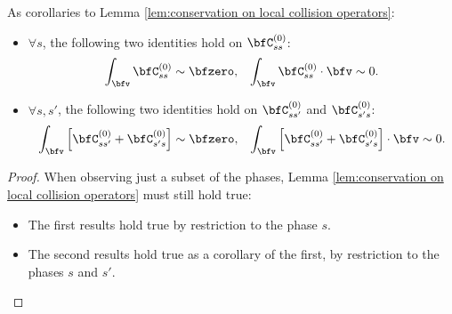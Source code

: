     \begin{corollary}\label{cor:phase-restricted conservation on local collision operators}
        As corollaries to Lemma \ref{lem:conservation on local collision operators}:
        \begin{itemize}
            \item  $\forall s$, the following two identities hold on $\bfC_{ss}^{(0)}$:
            \begin{align}
                \int_{\bfv}\bfC_{ss}^{(0)}           \sim  \bfzero,  &&
                \int_{\bfv}\bfC_{ss}^{(0)}\cdot\bfv  \sim  0.
            \end{align}
            \item  $\forall s, s'$, the following two identities hold on $\bfC_{ss'}^{(0)}$ and $\bfC_{s's}^{(0)}$:
            \begin{align}
                \int_{\bfv}\left[\bfC_{ss'}^{(0)} + \bfC_{s's}^{(0)}\right]           \sim  \bfzero,  &&
                \int_{\bfv}\left[\bfC_{ss'}^{(0)} + \bfC_{s's}^{(0)}\right]\cdot\bfv  \sim  0.
            \end{align}
        \end{itemize}
    \end{corollary}
    \begin{proof}
        When observing just a subset of the phases, Lemma \ref{lem:conservation on local collision operators} must still hold true:
        \begin{itemize}
            \item  The first results hold true by restriction to the phase $s$.
            \item  The second results hold true as a corollary of the first, by restriction to the phases $s$ and $s'$.
        \end{itemize}
    \end{proof}
